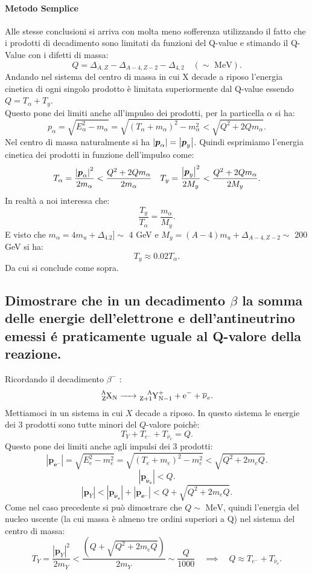 \paragraph{Metodo Semplice}%
Alle stesse conclusioni si arriva con molta meno sofferenza utilizzando il fatto che i prodotti di decadimento sono limitati da funzioni del Q-value e stimando il Q-Value con i difetti di massa:
\[
	Q = \Delta_{A,Z} - \Delta_{A-4,Z-2} -\Delta_{4,2} \quad \left( \sim \text{ MeV} \right) 
.\]
Andando nel sistema del centro di massa in cui X decade a riposo l'energia cinetica di ogni singolo prodotto è limitata superiormente dal Q-value essendo $Q = T_{\alpha}+ T_{y}$.\\
Questo pone dei limiti anche all'impulso dei prodotti, per la particella $\alpha$ si ha:
\[
	p_{\alpha}= \sqrt{E_{\alpha}^2-m_{\alpha}}= \sqrt{\left( T_{\alpha}+m_{\alpha}\right)^2- m_{\alpha}^2 } < \sqrt{Q^2+2Qm_{\alpha}} 
.\] 
Nel centro di massa naturalmente si ha $\left| \boldsymbol{p}_{\alpha} \right| = \left| \boldsymbol{p}_{y} \right| $. Quindi esprimiamo l'energia cinetica dei prodotti in  funzione dell'impulso come:
\begin{align*}
	&T_{\alpha} = \frac{\left| \boldsymbol{p}_{\alpha} \right|^2 }{2m_{\alpha}}< \frac{Q^2+2Qm_{\alpha}}{2m_{\alpha}} 
	&T_{y} =  \frac{\left| \boldsymbol{p}_{y} \right|^2 }{2M_{y}}< \frac{Q^2+2Qm_{\alpha}}{2M_{y}} 
.\end{align*}
In realtà a noi interessa che:
\[
	\frac{T_{y}}{T_{\alpha}}= \frac{m_{\alpha}}{M_{y}}
.\] 
E visto che $m_{\alpha} = 4 m_{u} + \Delta_{4.2} ]\sim$ 4 GeV e $M_{y}=\left(A-4\right)m_{u}+ \Delta_{A-4, Z-2}\sim$ 200 GeV si ha:
\[
	T_{y} \approx 0.02 T_{\alpha}
.\] 
Da cui si conclude come sopra.


\subsection[\hspace{2mm} ]{Dimostrare che in un decadimento $\beta$ la somma delle energie dell'elettrone e dell'antineutrino emessi é praticamente uguale al Q-valore della reazione.}
Ricordando il decadimento $\beta^-$ :
\[
\ce{\ce{^{A}_{Z}X_{N}} -> \ce{^{A}_{Z+1}Y^+_{N-1}} + e^- + \overline{\nu}_e}
.\]
Mettiamoci in un sistema in cui $X$ decade a riposo. In questo sistema le energie dei 3 prodotti sono tutte minori del $Q$-valore poichè:
\[
T_Y + T_{e^-} + T_{\overline{\nu}_e} = Q
.\] 
Questo pone dei limiti anche agli impulsi dei 3 prodotti:
\[
	\left| \boldsymbol{p_{e^-}} \right| = \sqrt{E_e^2 - m_e^2}  = \sqrt{\left( T_e + m_e \right)^2 - m_e^2 } < \sqrt{Q^2+2m_eQ}  
.\] 
\[
	\left| \boldsymbol{p_{\overline{\nu}_e}} \right| < Q 
.\]
\[
\left| \boldsymbol{p}_Y \right| <  \left| \boldsymbol{p_{\overline{\nu}_e}} \right| + \left| \boldsymbol{p_{e^-}} \right| < Q + \sqrt{Q^2+2m_eQ} 
.\] 
Come nel caso precedente si può dimostrare che $Q \sim \text{ MeV}$, quindi l'energia del nucleo uscente (la cui massa è almeno tre ordini superiori a Q) nel sistema del centro di massa:
\[
	T_{Y} = \frac{\left| \boldsymbol{p}_Y \right|^2 }{2m_Y} < \frac{\left( Q + \sqrt{Q^2+2m_e Q}  \right) }{2m_Y}  \sim \frac{Q}{1000} \quad \implies
	\quad Q \approx T_{e^-} + T_{\overline{\nu}_e} 
.\] 
